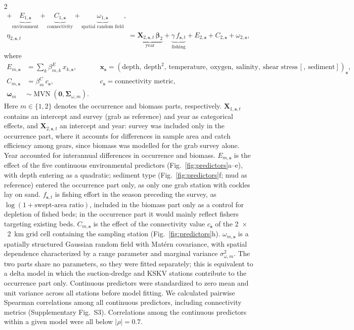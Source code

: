 \begin{spacing}{2}
\begin{align}
+ \underbrace{E_{1,\mathbf{s}}}_{\text{environment}}
+ \underbrace{C_{1,\mathbf{s}}}_{\text{connectivity}}
+ \underbrace{\omega_{1,\mathbf{s}}}_{\text{spatial random field}},\\
\eta_{2,\mathbf{s},t} &=
\underbrace{\mathbf{X}_{2,\mathbf{s},t}\,\boldsymbol{\beta}_2}_{\text{year}}
+ \underbrace{\gamma\, f_{\mathbf{s},t}}_{\text{fishing}}
+ E_{2,\mathbf{s}} + C_{2,\mathbf{s}} + \omega_{2,\mathbf{s}},
\end{align}
where
\begin{align}
E_{m,\mathbf{s}} &= \sum_{k} \beta^{E}_{m,k}\, x_{k,\mathbf{s}},
&& \mathbf{x}_{\mathbf{s}} = (\text{depth},\ \text{depth}^2,\ \text{temperature},\ \text{oxygen},\ \text{salinity},\ \text{shear stress}\,[,\ \text{sediment}])_{\mathbf{s}},\\
C_{m,\mathbf{s}} &= \beta^{C}_m\, c_{\mathbf{s}},
&& c_{\mathbf{s}} = \text{connectivity metric},\\
\boldsymbol{\omega}_m &\sim \operatorname{MVN}\!\left(\mathbf{0}, \boldsymbol{\Sigma}_{\omega,m}\right).
\end{align}
Here $m \in \{1, 2\}$ denotes the occurrence and biomass parts, respectively. $\mathbf{X}_{1,\mathbf{s},t}$ contains an intercept and survey (grab as reference) and year as categorical effects, and $\mathbf{X}_{2,\mathbf{s},t}$ an intercept and year: survey was included only in the occurrence part, where it accounts for differences in sample area and catch efficiency among gears, since biomass was modelled for the grab survey alone. Year accounted for interannual differences in occurrence and biomass. $E_{m,\mathbf{s}}$ is the effect of the five continuous environmental predictors (Fig.~\ref{fig:predictors}a--e), with depth entering as a quadratic; sediment type (Fig.~\ref{fig:predictors}f; mud as reference) entered the occurrence part only, as only one grab station with cockles lay on sand. $f_{\mathbf{s},t}$ is fishing effort in the season preceding the survey, as $\log(1 + \text{swept-area ratio})$, included in the biomass part only as a control for depletion of fished beds; in the occurrence part it would mainly reflect fishers targeting existing beds. $C_{m,\mathbf{s}}$ is the effect of the connectivity value $c_{\mathbf{s}}$ of the 2~$\times$~2~km grid cell containing the sampling station (Fig.~\ref{fig:predictors}h). $\omega_{m,\mathbf{s}}$ is a spatially structured Gaussian random field with Matérn covariance, with spatial dependence characterized by a range parameter and marginal variance $\sigma^2_{\omega,m}$. The two parts share no parameters, so they were fitted separately; this is equivalent to a delta model in which the suction-dredge and KSKV stations contribute to the occurrence part only. Continuous predictors were standardized to zero mean and unit variance across all stations before model fitting. We calculated pairwise Spearman correlations among all continuous predictors, including connectivity metrics (Supplementary Fig.~S3). Correlations among the continuous predictors within a given model were all below $|\rho| = 0.7$.


\end{spacing}

